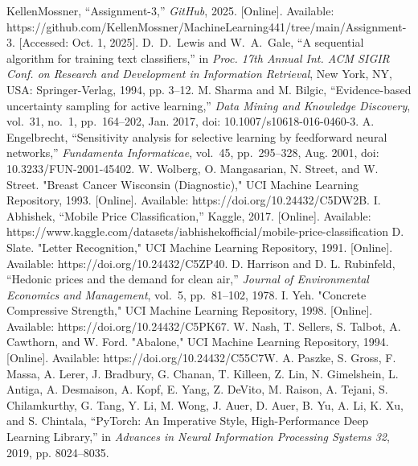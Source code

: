 \documentclass[conference]{IEEEtran}
\begin{document}
	\begin{thebibliography}{00}
		 KellenMossner, ``Assignment-3,'' \textit{GitHub}, 2025. [Online]. Available: https://github.com/KellenMossner/MachineLearning441/tree/main/Assignment-3. [Accessed: Oct. 1, 2025].
		 D.~D.~Lewis and W.~A.~Gale, ``A sequential algorithm for training text classifiers,'' in \emph{Proc. 17th Annual Int. ACM SIGIR Conf. on Research and Development in Information Retrieval}, New York, NY, USA: Springer-Verlag, 1994, pp. 3--12.
		 M. Sharma and M. Bilgic, ``Evidence-based uncertainty sampling for active learning,'' \emph{Data Mining and Knowledge Discovery}, vol.~31, no.~1, pp.~164--202, Jan. 2017, doi: 10.1007/s10618-016-0460-3.
		 A. Engelbrecht, ``Sensitivity analysis for selective learning by feedforward neural networks,'' \emph{Fundamenta Informaticae}, vol.~45, pp.~295--328, Aug. 2001, doi: 10.3233/FUN-2001-45402.
		 W. Wolberg, O. Mangasarian, N. Street, and W. Street. "Breast Cancer Wisconsin (Diagnostic)," UCI Machine Learning Repository, 1993. [Online]. Available: https://doi.org/10.24432/C5DW2B.
		 I. Abhishek, ``Mobile Price Classification,'' Kaggle, 2017. [Online]. Available: https://www.kaggle.com/datasets/iabhishekofficial/mobile-price-classification
		 D. Slate. "Letter Recognition," UCI Machine Learning Repository, 1991. [Online]. Available: https://doi.org/10.24432/C5ZP40.
		 D. Harrison and D. L. Rubinfeld, ``Hedonic prices and the demand for clean air,'' \emph{Journal of Environmental Economics and Management}, vol.~5, pp.~81--102, 1978.
		 I. Yeh. "Concrete Compressive Strength," UCI Machine Learning Repository, 1998. [Online]. Available: https://doi.org/10.24432/C5PK67.
		 W. Nash, T. Sellers, S. Talbot, A. Cawthorn, and W. Ford. "Abalone," UCI Machine Learning Repository, 1994. [Online]. Available: https://doi.org/10.24432/C55C7W.
			A. Paszke, S. Gross, F. Massa, A. Lerer, J. Bradbury, G. Chanan, T. Killeen, Z. Lin, N. Gimelshein, L. Antiga, A. Desmaison, A. Kopf, E. Yang, Z. DeVito, M. Raison, A. Tejani, S. Chilamkurthy, G. Tang, Y. Li, M. Wong, J. Auer, D. Auer, B. Yu, A. Li, K. Xu, and S. Chintala, ``PyTorch: An Imperative Style, High-Performance Deep Learning Library,'' in \textit{Advances in Neural Information Processing Systems 32}, 2019, pp. 8024--8035.
	\end{thebibliography}
	
\end{document}
